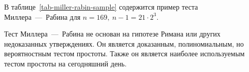 \example
В таблице~\ref{tab-miller-rabin-sample} содержится пример теста Миллера~---~Рабина для $n = 169, ~ n-1 = 21 \cdot 2^3$.
\begin{table}[!ht]
    \centering
    \caption{Пример теста Миллера~---~Рабина для $n = 169$ и четырёх оснований $a$: 19, 22, 23, 2\label{tab-miller-rabin-sample}}
\end{table}
\exampleend

Тест Миллера~---~Рабина не основан на гипотезе Римана или других недоказанных утверждениях. Он является доказанным, полиномиальным, но вероятностным тестом простоты. Также он является наиболее используемым тестом простоты на сегодняшний день.

